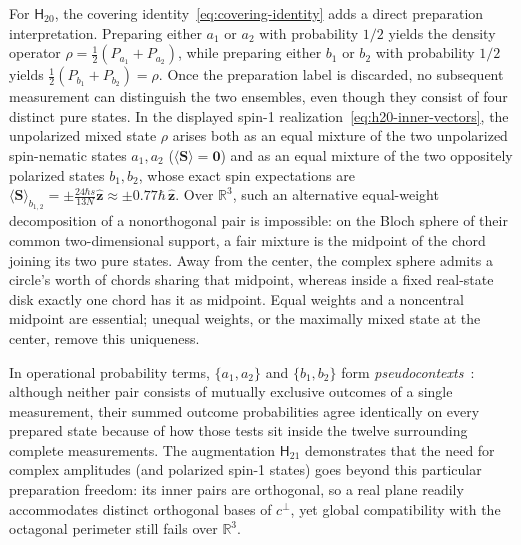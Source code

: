 \documentclass[twocolumn,aps,pra,floatfix,amsmath,amssymb,longbibliography]{revtex4-2}
\newenvironment{handrewrite}{\leavevmode\color{blue}}{}
\theoremstyle{definition}
\theoremstyle{remark}
\newcommand{\R}{\mathbb R}
\newcommand{\Htwenty}{\mathsf H_{20}}
\newcommand{\Htwentyone}{\mathsf H_{21}}
\begin{document}
\begin{handrewrite}
For $\Htwenty$, the covering identity~\eqref{eq:covering-identity} adds a
direct preparation interpretation.  Preparing either $a_1$ or $a_2$ with
probability $1/2$ yields the density operator
$\rho=\tfrac12(P_{a_1}+P_{a_2})$, while preparing either $b_1$ or $b_2$ with
probability $1/2$ yields $\tfrac12(P_{b_1}+P_{b_2})=\rho$.  Once the
preparation label is discarded, no subsequent measurement can distinguish the
two ensembles, even though they consist of four distinct pure states.  In the
displayed spin-1 realization~\eqref{eq:h20-inner-vectors}, the unpolarized
mixed state $\rho$ arises both as an equal mixture of the two unpolarized
spin-nematic states $a_1,a_2$ ($\langle\mathbf S\rangle=\mathbf 0$) and as an
equal mixture of the two oppositely polarized states $b_1,b_2$, whose exact
spin expectations are $\langle\mathbf S\rangle_{b_{1,2}}=\pm\frac{24\hbar s}{13N}\hat{\mathbf z}\approx\pm0.77\hbar\,\hat{\mathbf z}$.
Over $\R^3$, such an alternative equal-weight decomposition of a nonorthogonal
pair is impossible: on the Bloch sphere of their common two-dimensional
support, a fair mixture is the midpoint of the chord joining its two pure
states.  Away from the center, the complex sphere admits a circle's worth of
chords sharing that midpoint, whereas inside a fixed real-state disk exactly
one chord has it as midpoint.  Equal weights and a noncentral midpoint are
essential; unequal weights, or the maximally mixed state at the center, remove
this uniqueness.

In operational probability terms, $\{a_1,a_2\}$ and $\{b_1,b_2\}$ form
\emph{pseudocontexts}~\cite{2026-Navara-Svozil-pseudocontexts}: although
neither pair consists of mutually exclusive outcomes of a single measurement,
their summed outcome probabilities agree identically on every prepared state
because of how those tests sit inside the twelve surrounding complete
measurements.  The augmentation $\Htwentyone$ demonstrates that the need for
complex amplitudes (and polarized spin-1 states) goes beyond this particular
preparation freedom: its inner pairs are orthogonal, so a real plane readily
accommodates distinct orthogonal bases of $c^\perp$, yet global compatibility
with the octagonal perimeter still fails over $\R^3$.


\end{handrewrite}
\end{document}
